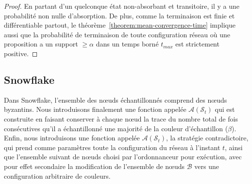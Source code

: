 \documentclass[a4,twocolumn,10pt]{article}
\theoremstyle{definition}
\begin{document}
\begin{appendices}
\begin{proof}
En partant d'un quelconque état non-absorbant et transitoire, il y a une probabilité non nulle d'absorption. De plus, comme la terminaison est finie et différentiable partout, le théorème~\ref{theorem:mean-convergence-time} implique aussi que la probabilité de terminaison de toute configuration réseau où une proposition a un support $\geq \alpha$ dans un temps borné $t_{max}$ est strictement positive.
\end{proof}

\subsection{Snowflake}
\label{subsection:appendix_snowflake}
Dans Snowflake, l'ensemble des nœuds échantillonnés comprend des nœuds byzantins.
Nous introduisons finalement une fonction appelée $\mathcal{A}(\mathcal{S}_t)$ qui est construite en faisant conserver à chaque nœud la trace du nombre total de fois consécutives qu'il a échantillonné une majorité de la couleur d'échantillon ($\beta$).
Enfin, nous introduisons une fonction appelée $\mathcal{A}(\mathcal{S}_t)$, la stratégie contradictoire, qui prend comme paramètres toute la configuration du réseau à l'instant $t$, ainsi que l'ensemble suivant de nœuds choisi par l'ordonnanceur pour exécution, avec pour effet secondaire la modification de l'ensemble de nœuds $\mathcal{B}$ vers une configuration arbitraire de couleurs.


\end{appendices}
\end{document}
